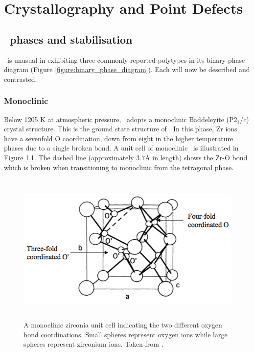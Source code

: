 \chapter{Crystallography and Point Defects}

\label{ch:crystallography}

\section{\zirconia\ phases and stabilisation}

\zirconia\ is unusual in exhibiting three commonly reported polytypes in its binary phase diagram (Figure \ref{figure:binary_phase_diagram}). Each will now be described and contrasted.



\subsection{Monoclinic}

Below 1205 K at atmospheric pressure, \zirconia\ adopts a monoclinic Baddeleyite (P$2_{1}/c$) crystal structure. This is the ground state structure of \zirconia . In this phase, Zr ions have a sevenfold O coordination, down from eight in the higher temperature phases due to a single broken bond. A unit cell of monoclinic \zirconia\ is illustrated in Figure \ref{figure:coordination}. The dashed line (approximately 3.7\r{A} in length) shows the Zr-O bond which is broken when transitioning to monoclinic from the tetragonal phase.

\begin{figure}[htp] %
\centering
\includegraphics[height=7.5cm]{images/coordination.png}
\caption[A monoclinic zirconia unit cell indicating the two different oxygen bond coordinations. Small spheres represent oxygen ions while large spheres represent zirconium ions.]{A monoclinic zirconia unit cell indicating the two different oxygen bond coordinations. Small spheres represent oxygen ions while large spheres represent zirconium ions. Taken from \cite{Xia2010}.
\label{figure:coordination}}
\end{figure}

